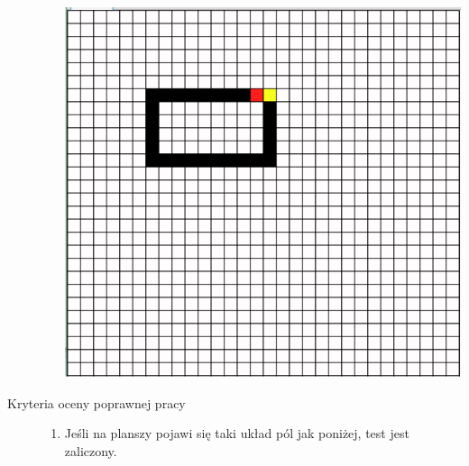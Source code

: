 \documentclass[a4paper,11pt]{article}
\begin{document}
\begin{description}
\begin{enumerate}
\includegraphics[width=\textwidth]{TestGUI2}
\end{enumerate}

\item[Kryteria oceny poprawnej pracy] \hfill
\begin{enumerate}
\item Jeśli na planszy pojawi się taki układ pól jak poniżej, test jest zaliczony.


\end{enumerate}
\end{description}
\end{document}
